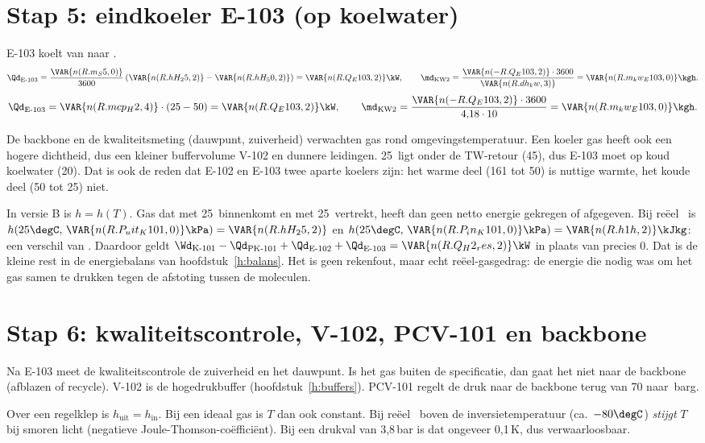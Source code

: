 \section{Stap 5: eindkoeler E-103 (op koelwater)}
E-103 koelt van  naar \degC.
\[
\Qd_{\text{E-103}} = \frac{\VAR{n(R.m_S5,0)}}{3600}\,(\VAR{n(R.hH_25,2)} - \VAR{n(R.hH_50,2)}) = \VAR{n(R.Q_E103,2)}\kW,\qquad
\md_\mathrm{KW2} = \frac{\VAR{n(-R.Q_E103,2)}\cdot3600}{\VAR{n(R.dh_kw,3)}} = \VAR{n(R.m_kw_E103,0)}\kgh .
\]
\[
\Qd_{\text{E-103}} = \VAR{n(R.mcp_H2,4)}\cdot(25-50) = \VAR{n(R.Q_E103,2)}\kW,\qquad
\md_\mathrm{KW2} = \frac{\VAR{n(-R.Q_E103,2)}\cdot3600}{4{,}18\cdot 10} = \VAR{n(R.m_kw_E103,0)}\kgh .
\]
\begin{waarom}
De backbone en de kwaliteitsmeting (dauwpunt, zuiverheid) verwachten gas rond omgevingstemperatuur. Een koeler gas
heeft ook een hogere dichtheid, dus een kleiner buffervolume V-102 en dunnere leidingen. 25\degC\ ligt onder de
TW-retour (45\degC), dus E-103 moet op koud koelwater (20\degC). Dat is ook de reden dat E-102 en E-103 twee
aparte koelers zijn: het warme deel (161 tot 50\degC) is nuttige warmte, het koude deel (50 tot 25\degC) niet.
\end{waarom}

\begin{coolprop}
In versie B is $h=h(T)$. Gas dat met 25\degC\ binnenkomt en met 25\degC\ vertrekt, heeft dan geen netto energie
gekregen of afgegeven. Bij reëel \HH\ is $h(25\degC,\,\VAR{n(R.P_uit_K101,0)}\kPa) = \VAR{n(R.hH_25,2)}$ en
$h(25\degC,\,\VAR{n(R.P_in_K101,0)}\kPa) = \VAR{n(R.h1h,2)}\kJkg$: een verschil van \kJkg.
Daardoor geldt
$\Wd_{\text{K-101}} - \Qd_{\text{PK-101}} + \Qd_{\text{E-102}} + \Qd_{\text{E-103}} = \VAR{n(R.Q_H2_res,2)}\kW$
in plaats van precies 0. Dat is de kleine rest in de energiebalans van hoofdstuk~\ref{h:balans}. Het is geen
rekenfout, maar echt reëel-gasgedrag: de energie die nodig was om het gas samen te drukken tegen de afstoting tussen
de moleculen.
\end{coolprop}

\section{Stap 6: kwaliteitscontrole, V-102, PCV-101 en backbone}
Na E-103 meet de kwaliteitscontrole de zuiverheid en het dauwpunt. Is het gas buiten de specificatie, dan gaat het
niet naar de backbone (afblazen of recycle). V-102 is de hogedrukbuffer (hoofdstuk~\ref{h:buffers}). PCV-101 regelt
de druk naar de backbone terug van 70 naar \,barg.
\begin{methode}
Over een regelklep is $h_\mathrm{uit} = h_\mathrm{in}$. Bij een ideaal gas is $T$ dan ook constant. Bij reëel
\HH\ boven de inversietemperatuur (ca.\ $-80\degC$) \emph{stijgt} $T$ bij smoren licht (negatieve
Joule-Thomson-coëfficiënt). Bij een drukval van 3,8\,bar is dat ongeveer 0,1\,K, dus verwaarloosbaar.
\end{methode}


